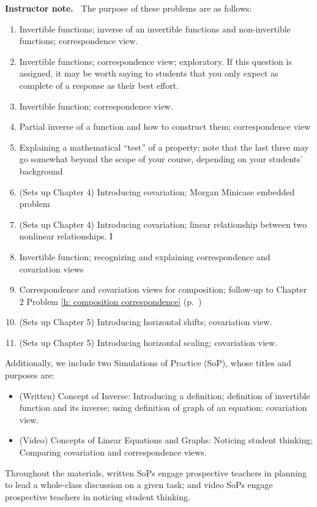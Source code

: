 \documentclass[11pt]{article}
\newenvironment{bignote}[1][Instructor note]%
	{\begin{mdframed}\raggedright{\bf #1.~}}
	{\end{mdframed}}
\theoremstyle{definition}
\begin{document}
\begin{bignote}
The purpose of these problems are as follows:
	\begin{enumerate}
	\item  Invertible functions; inverse of an invertible functions and non-invertible functions; correspondence view.
	\item Invertible functions; correspondence view; exploratory. If this question is assigned, it may be worth saying to students that you only expect as complete of a response as their best effort.
	\item Invertible function; correspondence view.
	\item Partial inverse of a function and how to construct them; correspondence view
	\item Explaining a mathematical ``test'' of a property; note that the last three may go somewhat beyond the scope of your course, depending on your students' background
	\item (Sets up Chapter 4) Introducing covariation; Morgan Minicase embedded problem
	\item (Sets up Chapter 4) Introducing covariation; linear relationship between two nonlinear relationships. I
	\item Invertible function; recognizing and explaining correspondence and covariation views
	\item Correspondence and covariation views for composition; follow-up to Chapter 2 Problem \ref{h: composition correspondence} (p.~\pageref{h: composition correspondence})
	\item (Sets up Chapter 5) Introducing horizontal shifts; covariation view.
	\item (Sets up Chapter 5) Introducing horizontal scaling; covariation view.
	\end{enumerate}
	
Additionally, we include two Simulations of Practice (SoP), whose titles and purposes are:
	\begin{itemize}
	\item (Written) Concept of Inverse: Introducing a definition; definition of invertible function and its inverse; using definition of graph of an equation; covariation view.
	\item (Video) Concepts of Linear Equations and Graphs: Noticing student thinking; Comparing covariation and correspondence views.
	\end{itemize}
	
Throughout the \MODULES materials, written SoPs engage prospective teachers in planning to lead a whole-class discussion on a given task; and video SoPs engage prospective teachers in noticing student thinking.
\end{bignote}
\end{document}
